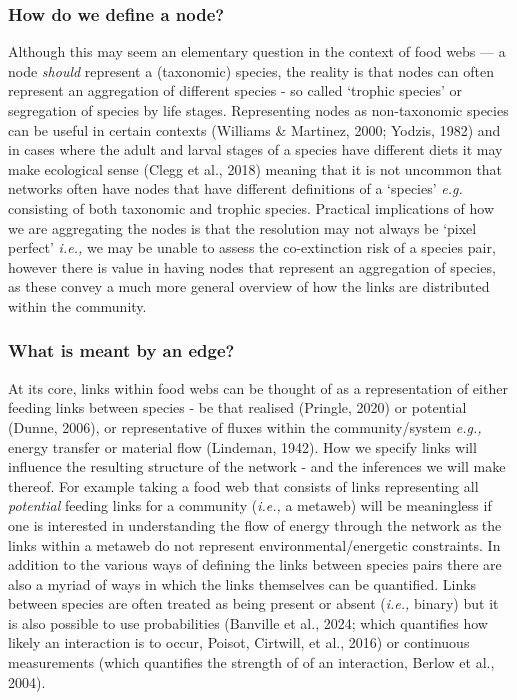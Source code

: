 \documentclass[
]{article}
\begin{document}
\subsubsection{How do we define a node?}\label{how-do-we-define-a-node}

Although this may seem an elementary question in the context of food
webs --- a node \emph{should} represent a (taxonomic) species, the
reality is that nodes can often represent an aggregation of different
species - so called `trophic species' or segregation of species by life
stages. Representing nodes as non-taxonomic species can be useful in
certain contexts (Williams \& Martinez, 2000; Yodzis, 1982) and in cases
where the adult and larval stages of a species have different diets it
may make ecological sense (Clegg et al., 2018) meaning that it is not
uncommon that networks often have nodes that have different definitions
of a `species' \emph{e.g.} consisting of both taxonomic and trophic
species. Practical implications of how we are aggregating the nodes is
that the resolution may not always be `pixel perfect' \emph{i.e.,} we
may be unable to assess the co-extinction risk of a species pair,
however there is value in having nodes that represent an aggregation of
species, as these convey a much more general overview of how the links
are distributed within the community.

\subsubsection{What is meant by an
edge?}\label{what-is-meant-by-an-edge}

At its core, links within food webs can be thought of as a
representation of either feeding links between species - be that
realised (Pringle, 2020) or potential (Dunne, 2006), or representative
of fluxes within the community/system \emph{e.g.,} energy transfer or
material flow (Lindeman, 1942). How we specify links will influence the
resulting structure of the network - and the inferences we will make
thereof. For example taking a food web that consists of links
representing all \emph{potential} feeding links for a community
(\emph{i.e.,} a metaweb) will be meaningless if one is interested in
understanding the flow of energy through the network as the links within
a metaweb do not represent environmental/energetic constraints. In
addition to the various ways of defining the links between species pairs
there are also a myriad of ways in which the links themselves can be
quantified. Links between species are often treated as being present or
absent (\emph{i.e.,} binary) but it is also possible to use
probabilities (Banville et al., 2024; which quantifies how likely an
interaction is to occur, Poisot, Cirtwill, et al., 2016) or continuous
measurements (which quantifies the strength of of an interaction, Berlow
et al., 2004).
\end{document}
